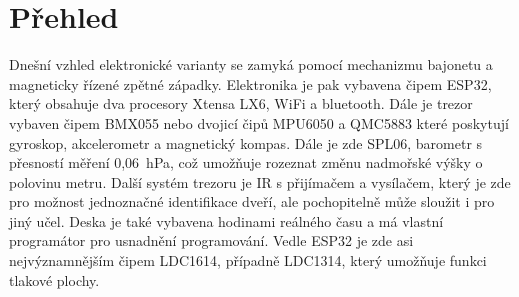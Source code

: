 \section{Přehled}

Dnešní vzhled elektronické varianty se zamyká pomocí mechanizmu bajonetu a magneticky řízené zpětné západky. Elektronika je pak vybavena čipem ESP32,
který obsahuje dva procesory Xtensa LX6, WiFi a bluetooth. Dále je trezor vybaven čipem BMX055 nebo dvojicí čipů MPU6050 a QMC5883 které poskytují 
gyroskop, akcelerometr a magnetický kompas. Dále je zde SPL06, barometr s přesností měření 0,06~hPa, což umožňuje rozeznat změnu nadmořské výšky 
o polovinu metru. Další systém trezoru je IR s přijímačem a vysílačem, který je zde pro možnost jednoznačné identifikace dveří, ale pochopitelně může 
sloužit i pro jiný učel. Deska je také vybavena hodinami reálného času a má vlastní programátor pro usnadnění programování. Vedle ESP32 je zde asi 
nejvýznamnějším čipem LDC1614, případně LDC1314, který umožňuje funkci tlakové plochy.

\begin{table}[h]
    \centering
    \caption{shrnutí elektronického vybavení}
    \label{tab:COMPARATION}
\end{table}

